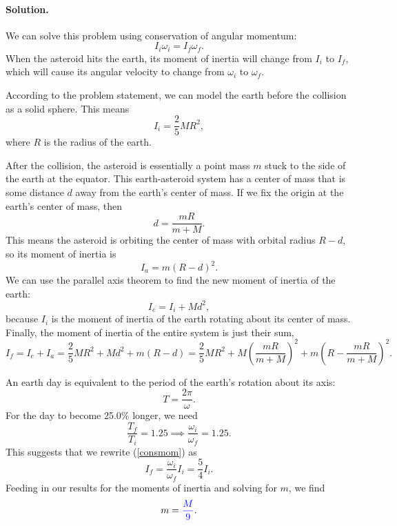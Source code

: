 \documentclass[11pt]{article}
\newcommand{\refeq}[1]{(\ref{#1})}
\newcommand{\beq}{\begin{equation*}}
\newcommand{\eeq}{\end{equation*}}
\newcommand{\beqn}{\begin{equation}}
\newcommand{\eeqn}{\end{equation}}
\newenvironment{solution}
{
    \paragraph{Solution.}
    \ignorespaces
}
{
    \bigskip
}
\begin{document}
\begin{solution}
	We can solve this problem using conservation of angular momentum:
	\beqn \label{consmom}
		I_i \omega_i = I_f \omega_f.
	\eeqn
	When the asteroid hits the earth, its moment of inertia will change from $I_i$ to $I_f$, which will cause its angular velocity to change from $\omega_i$ to $\omega_f$.
	
	According to the problem statement, we can model the earth before the collision as a solid sphere.  This means
	\beq
		I_i = \frac{2}{5} M R^2,
	\eeq
	where $R$ is the radius of the earth.
	
	After the collision, the asteroid is essentially a point mass $m$ stuck to the side of the earth at the equator.  This earth-asteroid system has a center of mass that is some distance $d$ away from the earth's center of mass.  If we fix the origin at the earth's center of mass, then
	\beq
		d = \frac{m R}{m + M}.
	\eeq
	This means the asteroid is orbiting the center of mass with orbital radius $R - d$, so its moment of inertia is
	\beq
		I_a = m (R - d)^2.
	\eeq
	We can use the parallel axis theorem to find the new moment of inertia of the earth:
	\beq
		I_e = I_i + M d^2,
	\eeq
	because $I_i$ is the moment of inertia of the earth rotating about its center of mass.  Finally, the moment of inertia of the entire system is just their sum,
	\beq
		I_f = I_e + I_a = \frac{2}{5} M R^2 + M d^2 + m (R - d) = \frac{2}{5} M R^2 + M \left( \frac{m R}{m + M} \right)^2 + m \left( R - \frac{m R}{m + M} \right)^2.
	\eeq
	
	An earth day is equivalent to the period of the earth's rotation about its axis:
	\beq
		T = \frac{2 \pi}{\omega}.
	\eeq
	For the day to become 25.0\% longer, we need
	\beq
		\frac{T_f}{T_i} = 1.25 \implies \frac{\omega_i}{\omega_f} = 1.25.
	\eeq
	This suggests that we rewrite \refeq{consmom} as
	\beq
		I_f = \frac{\omega_i}{\omega_f} I_i = \frac{5}{4} I_i.
	\eeq
	Feeding in our results for the moments of inertia and solving for $m$, we find
	\beq
		m = {\color{blue} \frac{M}{9}}.
	\eeq
\end{solution}
\end{document}
